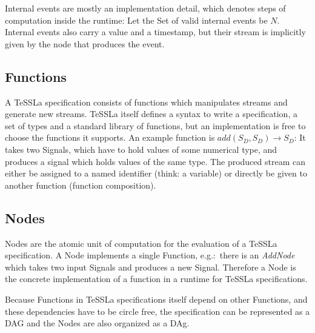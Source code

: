Internal events are mostly an implementation detail, which denotes steps of computation inside the runtime:
Let the Set of valid internal events be \(N\).
Internal events also carry a value and a timestamp, but their stream is implicitly given by the node that produces the event.

\subsection{Functions}
\label{sec:concepts:defs:functions}

A TeSSLa specification consists of functions which manipulates streams and generate new streams.
TeSSLa itself defines a syntax to write a specification, a set of types and a standard library of functions, but an implementation is free to choose the functions it supports.
An example function is \(add(S_D,S_D) \rightarrow S_D\): It takes two Signals, which have to hold values of some numerical type, and produces a signal which holds values of the same type.
The produced stream can either be assigned to a named identifier (think: a variable) or directly be given to another function (function composition).

\subsection{Nodes}
\label{sec:concepts:defs:nodes}

Nodes are the atomic unit of computation for the evaluation of a TeSSLa specification.
A Node implements a single Function, e.g.:\ there is an \emph{AddNode} which takes two input Signals and produces a new Signal.
Therefore a Node is the concrete implementation of a function in a runtime for TeSSLa specifications.

Because Functions in TeSSLa specifications itself depend on other Functions, and these dependencies have to be circle free,
the specification can be represented as a DAG and the Nodes are also organized as a DAg.


